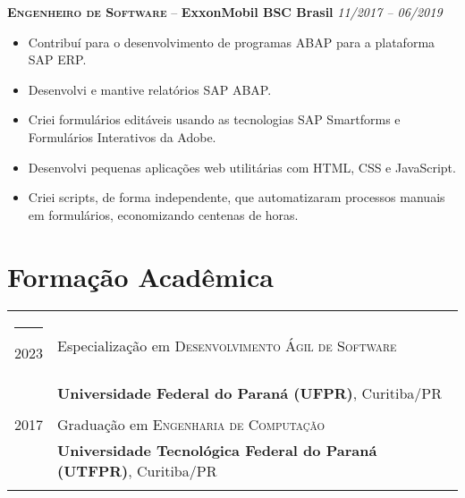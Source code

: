 \documentclass[a4paper,12pt]{article}
\newcommand{\preheadingspacing}{\vspace{6pt}}
\newcommand{\postheadingspacing}{\vspace{6pt}}
\begin{document}
\textbf{\textsc{Engenheiro de Software}} -- \textbf{ExxonMobil BSC Brasil} \hfill \textit{11/2017 -- 06/2019}

{\small
\begin{itemize}[leftmargin=*,label=\large\textbullet]
    \setlength\itemsep{-0.2em}
    \item Contribuí para o desenvolvimento de programas ABAP para a plataforma SAP ERP.
    \item Desenvolvi e mantive relatórios SAP ABAP.
    \item Criei formulários editáveis usando as tecnologias SAP Smartforms e Formulários Interativos da Adobe.
    \item Desenvolvi pequenas aplicações web utilitárias com HTML, CSS e JavaScript.
    \item Criei scripts, de forma independente, que automatizaram processos manuais em formulários, economizando centenas de horas.
\end{itemize}
}

\preheadingspacing
\section{Formação Acadêmica}
\postheadingspacing
\begin{tabular}{rl}
\rule{3.2cm}{0pt} 2023 & Especialização em \textsc{Desenvolvimento Ágil de Software} \\ &\normalsize\textbf{Universidade Federal do Paraná (UFPR)}, Curitiba/PR\\&\\
2017 & Graduação em \textsc{Engenharia de Computação} \\ &\normalsize\textbf{Universidade Tecnológica Federal do Paraná (UTFPR)}, Curitiba/PR\\&\\
\end{tabular}

\end{document}
